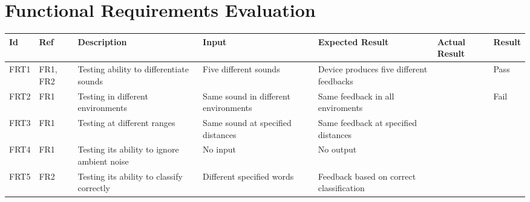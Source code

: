 \documentclass[12pt, titlepage]{article}
\begin{document}
\section{Functional Requirements Evaluation}

\begin{longtable}{|p{1.4cm}|p{1cm}|p{3cm}|p{1.5cm}|p{2.5cm}|p{2cm}|p{1.2cm}|}
  \hline
  \textbf{Id} & \textbf{Ref} & \textbf{Description}                                                         & \textbf{Input}                                    & \textbf{Expected Result}                                    & \textbf{Actual Result} & \textbf{Result}                                    \\ \hline
  FRT1        & FR1, FR2     & Testing ability to differentiate sounds                                     & Five different sounds                             & Device produces five different feedbacks                    &                        & {\color[HTML]{32CB00} Pass}                        \\ \hline
  FRT2        & FR1          & Testing in different environments                                            & Same sound in different environments              & Same feedback in all enviroments                            &                        & {\color[HTML]{FE0000} Fail}                        \\ \hline
  FRT3        & FR1          & Testing at different ranges                                                  & Same sound at specified distances                 & Same feedback at specified distances                        &                        & \cellcolor[HTML]{FFFFFF}{\color[HTML]{F8A102} TBD} \\ \hline
  FRT4        & FR1          & Testing its ability to ignore ambient noise                                  & No input                                          & No output                                                   &                        &                                                    \\ \hline
  FRT5        & FR2          & Testing its ability to classify correctly                                    & Different specified words                         & Feedback based on correct classification                    &                        &                                                    \\ \hline

\end{longtable}
\end{document}
